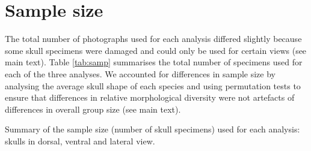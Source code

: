 \documentclass[12pt,a4paper]{article}
\begin{document}
\section{Sample size}


The total number of photographs used for each analysis differed slightly because some skull specimens were damaged and could only be used for certain views (see main text). Table \ref{tab:samp} summarises the total number of specimens used for each of the three analyses. We accounted for differences in sample size by analysing the average skull shape of each species and using permutation tests to ensure that differences in relative morphological diversity were not artefacts of differences in overall group size (see main text).

\begin{table}[!htbp] 
\caption[Sample size]
		{Summary of the sample size (number of skull specimens) used for each analysis: skulls in dorsal, ventral and lateral view.} 

\label{tab:samp}
\end{table}
\newpage
 
 
\end{document}
